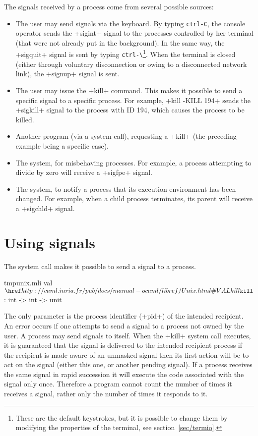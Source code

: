 The signals received by a process come from several possible sources:
%
\begin{itemize}

\item The user may send signals via the keyboard.  By typing \verb'ctrl-C',
  the console operator sends the \ml+sigint+ signal to the processes
  controlled by her terminal (that were not already put in the background).
  In the same way, the \ml+sigquit+ signal is sent by typing \verb'ctrl-\'\footnote{These 
    are the default keystrokes, but it is possible to change them by 
    modifying the properties of the terminal, see section~\ref {sec/termio}.}.  
  When the terminal is closed (either through voluntary disconnection or owing to a disconnected network link), the \ml+signup+ signal is sent.

\item The user may issue the \ml+kill+ command.  This makes it possible 
  to send a specific signal to a specific process.  For example, 
  \ml+kill -KILL 194+ sends the \ml+sigkill+ signal to the process with ID 194, which 
  causes the process to be killed.

\item Another program (via a system call), requesting a
  \ml+kill+ (the preceding example being a specific case).

\item The system, for misbehaving processes.  For example, a process 
  attempting to divide by zero will receive a \ml+sigfpe+ signal.

\item The system, to notify a process that its execution environment has 
  been changed.  For example, when a child process terminates, its parent 
  will receive a \ml+sigchld+ signal.

\end{itemize}


\section{Using signals}

The system call  makes it possible to send a
signal to a process.

%
\begin{listingcodefile}{tmpunix.mli}
val $\libvalue{Unix}{kill}$ : int -> int -> unit
\end{listingcodefile}
%
The only parameter is the process identifier (\ml+pid+) of the
intended recipient.  An error occurs if one attempts to send a signal
to a process not owned by the user.  A process may send signals to
itself.  When the \ml+kill+ system call executes, it is guaranteed
that the signal is delivered to the intended recipient process
\ie{} if the recipient is made aware of an unmasked signal then its
first action will be to act on the signal (either this one, or another
pending signal). If a process receives the same signal in rapid
succession it will execute the code associated with the signal only
once.  Therefore a program cannot count the number of times it
receives a signal, rather only the number of times it responds to it.

